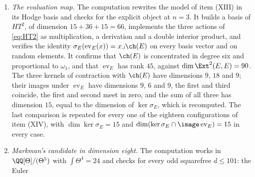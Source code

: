 \begin{enumerate}[label=\textup{(\Roman*)},leftmargin=*]
  $v\mapsto(v\lrcorner\lambda_{i})_{i}$ on $T$ has kernel exactly
  $T_{\mathrm{spl}}$ and rank $n(n-1)/2$. Each of the seven single classes
  $\gamma$, $\ell$, $\gamma+\ell$, $\gamma+2\ell$, $\beta$, $\widehat\beta$,
  $\beta+\ell$ already has $\{v\in T:v\lrcorner\theta=0\}=T_{\mathrm{spl}}$,
  and each of $150$ random rational classes off $\QQ\eta$ is contracted
  nontrivially by some vector of $T$, while $\eta$ and $3\eta$ are contracted
  to zero by all of $T$; this is the mechanism of . For
  the six line bundles of  at $n=3$ the computation
  finds kernel $T_{\mathrm{spl}}$ of dimension $6$ and rank $3$, and checks
  that $\sigma_{E}$ kills the image. It computes the annihilator of
  $\omega_{1}$ in $H^{0,2}$, of dimension $9$, checks that $\sigma_{E}$ kills
  $z\cdot\id_{E}$ for $z$ in it, and finds that the sum of that
  nine-dimensional space and the three-dimensional image has dimension $12$.
  Finally it recomputes the kernel of $\sigma_{E}$ as $15$, and checks that
  the components of every obstruction vector on $L_{i}$ and on
  $L_{i}^{-1}[3]$ are negatives of each other.
\item \emph{The evaluation map.} The computation rewrites the model of item
  (XIII) in its Hodge basis and checks  for the
  explicit object at $n=3$. It builds a basis of $HT^{2}$, of dimension
  $15+36+15=66$, implements the three actions of \eqref{eq:HT2} as
  multiplication, a derivation and a double interior product, and verifies
  the identity $\sigma_{E}(\operatorname{ev}_{E}(x))=x\lrcorner\ch(E)$ on
  every basis vector and on random elements. It confirms that $\ch(E)$ is
  concentrated in degree six and proportional to $\omega_{1}$, and that
  $\operatorname{ev}_{E}$ has rank $45$, against $\dim\Ext^{2}(E,E)=90$. The
  three kernels of contraction with $\ch(E)$ have dimensions $9$, $18$ and
  $9$; their images under $\operatorname{ev}_{E}$ have dimensions $9$, $6$
  and $9$, the first and third coincide, the first and second meet in zero,
  and the sum of all three has dimension $15$, equal to the dimension of
  $\ker\sigma_{E}$, which is recomputed. The last comparison is repeated for
  every one of the eighteen configurations of item (XIV), with
  $\dim\ker\sigma_{E}=15$ and
  $\dim(\ker\sigma_{E}\cap\image\operatorname{ev}_{E})=15$ in every case.
\item \emph{Markman's candidate in dimension eight.} The computation works in
  $\QQ[\Theta]/(\Theta^{5})$ with $\int\Theta^{4}=24$ and checks
   for every odd squarefree $d\le101$: the Euler

\end{enumerate}

